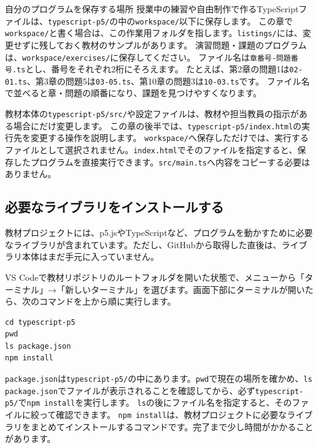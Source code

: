 \begin{pointbox}{自分のプログラムを保存する場所}
授業中の練習や自由制作で作るTypeScriptファイルは、\texttt{typescript-p5/}の中の\texttt{workspace/}以下に保存します。
この章で\texttt{workspace/}と書く場合は、この作業用フォルダを指します。\texttt{listings/}には、変更せずに残しておく教材のサンプルがあります。
演習問題・課題のプログラムは、\texttt{workspace/exercises/}に保存してください。
ファイル名は\texttt{章番号-問題番号.ts}とし、番号をそれぞれ2桁にそろえます。
たとえば、第2章の問題1は\texttt{02-01.ts}、第3章の問題5は\texttt{03-05.ts}、第10章の問題3は\texttt{10-03.ts}です。
ファイル名で並べると章・問題の順番になり、課題を見つけやすくなります。
\end{pointbox}

教材本体の\texttt{typescript-p5/src/}や設定ファイルは、教材や担当教員の指示がある場合にだけ変更します。
この章の後半では、\texttt{typescript-p5/index.html}の実行先を変更する操作を説明します。
\texttt{workspace/}へ保存しただけでは、実行するファイルとして選択されません。\texttt{index.html}でそのファイルを指定すると、保存したプログラムを直接実行できます。\texttt{src/main.ts}へ内容をコピーする必要はありません。

\subsection{必要なライブラリをインストールする}

教材プロジェクトには、p5.jsやTypeScriptなど、プログラムを動かすために必要なライブラリが含まれています。ただし、GitHubから取得した直後は、ライブラリ本体はまだ手元に入っていません。


VS Codeで教材リポジトリのルートフォルダを開いた状態で、メニューから「ターミナル」→「新しいターミナル」を選びます。画面下部にターミナルが開いたら、次のコマンドを上から順に実行します。

\begin{listing}[htbp]
\begin{verbatim}
cd typescript-p5
pwd
ls package.json
npm install
\end{verbatim}
\caption{実行用プロジェクトで必要なライブラリをインストールするコマンド}
\label{lst:chapter01-npm-install}
\end{listing}

\texttt{package.json}は\texttt{typescript-p5/}の中にあります。\texttt{pwd}で現在の場所を確かめ、\texttt{ls package.json}でファイルが表示されることを確認してから、必ず\texttt{typescript-p5/}で\texttt{npm install}を実行します。
\texttt{ls}の後にファイル名を指定すると、そのファイルに絞って確認できます。
\texttt{npm install}は、教材プロジェクトに必要なライブラリをまとめてインストールするコマンドです。完了まで少し時間がかかることがあります。

